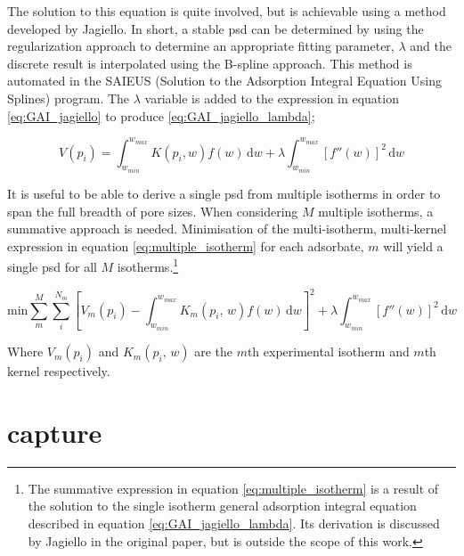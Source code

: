 The solution to this equation is quite involved, but is achievable using a method developed by Jagiello.\citep{Jagiello1994Stable} In short, a stable \acrshort{psd} can be determined by using the regularization approach to determine an appropriate fitting parameter, $\lambda$\citep{Hansen2001, Hansen1993use, Hansen2001L} and the discrete result is interpolated using the B-spline approach.\citep{knott2000interpolating, prautzsch2002bezier, deboor1978practical} This method is automated in the SAIEUS (Solution to the Adsorption Integral Equation Using Splines) program.\citep{Jagiello1994Stable} The $\lambda$ variable is added to the expression in equation \ref{eq:GAI_jagiello} to produce \ref{eq:GAI_jagiello_lambda};

\begin{equation} \label{eq:GAI_jagiello_lambda}
    V(p_i) = \int_{w_{min}}^{w_{max}} K(p_i,w) f(w) \, \mathrm{d}w + \lambda\int_{w_{min}}^{w_{max}}\left[ f''(w) \right]^2\, \mathrm{d}w
\end{equation}

It is useful to be able to derive a single \acrshort{psd} from multiple isotherms in order to span the full breadth of pore sizes. When considering $M$ multiple isotherms, a summative approach is needed.\citep{caguiat2014uncertainties} Minimisation of the multi-isotherm, multi-kernel  expression in equation \ref{eq:multiple_isotherm} for each \gls{adsorbate}, $m$ will yield a single \acrshort{psd} for all $M$ isotherms.\footnote{The summative expression in equation \ref{eq:multiple_isotherm} is a result of the solution to the single isotherm general \gls{adsorption} integral equation described in equation \ref{eq:GAI_jagiello_lambda}. Its derivation is discussed by Jagiello in the original paper,\citep{Jagiello1994Stable} but is outside the scope of this work.}

\begin{equation} \label{eq:multiple_isotherm}
    \mathrm{min}\sum_{m}^{M}\sum_{i}^{N_m}\left[ V_m(p_i) - \int_{w_{min}}^{w_{max}}K_m(p_i,\,w)f(w)\,\mathrm{d}w\right]^2 + \lambda\int_{w_{min}}^{w_{max}}\left[ f''(w) \right]^2\, \mathrm{d}w
\end{equation}

Where $V_m(p_i)$ and $K_m(p_i,\,w)$ are the $m$th experimental isotherm and $m$th kernel respectively.\citep{Jagiello2015Dual, Jagiello2008Characterization, Jagiello2007}

\section{\texorpdfstring{ capture}{CO2 capture}}
\label{s:ccs}

